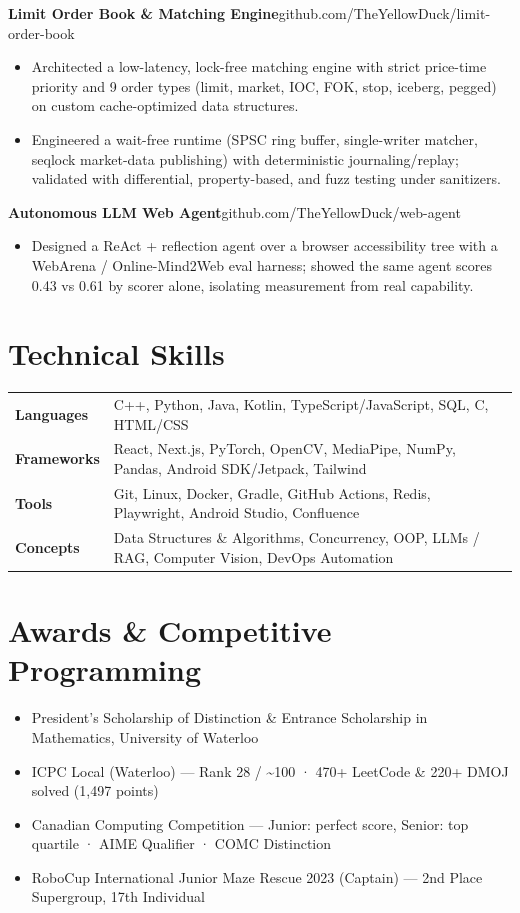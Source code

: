 \documentclass[letterpaper,11pt]{article}
\newcommand{\project}[3]{%
  \textbf{#1}\enspace{\small\textcolor{accent!55}{\textbar}\enspace #2}\hfill{\small #3}\par%
}
\newenvironment{bullets}
  {\begin{itemize}[leftmargin=1.5em,labelsep=0.5em,itemsep=1pt,topsep=1pt,parsep=0pt,partopsep=0pt]\small}
  {\end{itemize}\vspace{1pt}}
\begin{document}
\project{Limit Order Book \& Matching Engine}{C++20}{github.com/TheYellowDuck/limit-order-book}
\begin{bullets}
  \item Architected a low-latency, lock-free matching engine with strict price-time priority and 9 order types (limit, market, IOC, FOK, stop, iceberg, pegged) on custom cache-optimized data structures.
  \item Engineered a wait-free runtime (SPSC ring buffer, single-writer matcher, seqlock market-data publishing) with deterministic journaling/replay; validated with differential, property-based, and fuzz testing under sanitizers.
\end{bullets}

\project{Autonomous LLM Web Agent}{Python, Playwright}{github.com/TheYellowDuck/web-agent}
\begin{bullets}
  \item Designed a ReAct + reflection agent over a browser accessibility tree with a WebArena / Online-Mind2Web eval harness; showed the same agent scores 0.43 vs 0.61 by scorer alone, isolating measurement from real capability.
\end{bullets}

\section{Technical Skills}
\begin{tabularx}{\textwidth}{@{}l X@{}}
  \textbf{Languages} & C++, Python, Java, Kotlin, TypeScript/JavaScript, SQL, C, HTML/CSS\\
  \textbf{Frameworks} & React, Next.js, PyTorch, OpenCV, MediaPipe, NumPy, Pandas, Android SDK/Jetpack, Tailwind\\
  \textbf{Tools} & Git, Linux, Docker, Gradle, GitHub Actions, Redis, Playwright, Android Studio, Confluence\\
  \textbf{Concepts} & Data Structures \& Algorithms, Concurrency, OOP, LLMs / RAG, Computer Vision, DevOps Automation\\
\end{tabularx}

\section{Awards \& Competitive Programming}
\begin{bullets}
  \item President's Scholarship of Distinction \& Entrance Scholarship in Mathematics, University of Waterloo
  \item ICPC Local (Waterloo) --- Rank 28 / \textasciitilde100 · 470+ LeetCode \& 220+ DMOJ solved (1{,}497 points)
  \item Canadian Computing Competition --- Junior: perfect score, Senior: top quartile · AIME Qualifier · COMC Distinction
  \item RoboCup International Junior Maze Rescue 2023 (Captain) --- 2nd Place Supergroup, 17th Individual
\end{bullets}
\end{document}

